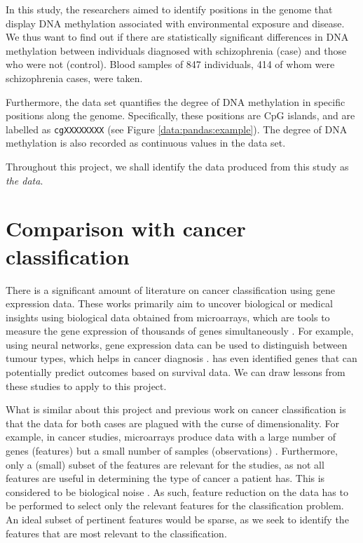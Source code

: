 \documentclass[12pt, twoside, a4paper]{report}
\begin{document}

In this study, the researchers aimed to identify positions in the genome that display DNA methylation associated with environmental exposure and disease. We thus want to find out if there are statistically significant differences in DNA methylation between individuals diagnosed with schizophrenia (case) and those who were not (control). Blood samples of 847 individuals, 414 of whom were schizophrenia cases, were taken.

Furthermore, the data set quantifies the degree of DNA methylation in specific positions along the genome. Specifically, these positions are CpG islands, and are labelled as \texttt{cgXXXXXXXX} (see Figure \ref{data:pandas:example}). The degree of DNA methylation is also recorded as continuous values in the data set.


Throughout this project, we shall identify the data produced from this study as \textit{the data}.


\section{Comparison with cancer classification} \label{bg:cancer}

There is a significant amount of literature on cancer classification using gene expression data. These works primarily aim to uncover biological or medical insights using biological data obtained from microarrays, which are tools to measure the gene expression of thousands of genes simultaneously \citep{RefWorks:79}. For example, using neural networks, gene expression data can be used to distinguish between tumour types, which helps in cancer diagnosis \citep{RefWorks:80, RefWorks:88}. \cite{RefWorks:196} has even identified genes that can potentially predict outcomes based on survival data. We can draw lessons from these studies to apply to this project.

What is similar about this project and previous work on cancer classification is that the data for both cases are plagued with the curse of dimensionality. For example, in cancer studies, microarrays produce data with a large number of genes (features) but a small number of samples (observations) \cite{RefWorks:88}. Furthermore, only a (small) subset of the features are relevant for the studies, as not all features are useful in determining the type of cancer a patient has. This is considered to be biological noise \cite{RefWorks:89}. As such, feature reduction on the data has to be performed to select only the relevant features for the classification problem. An ideal subset of pertinent features would be sparse, as we seek to identify the features that are most relevant to the classification.
\end{document}
